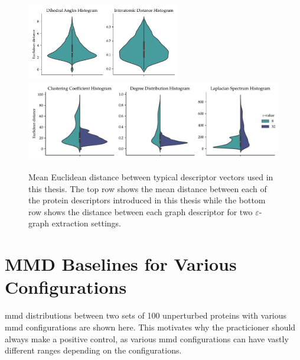\begin{figure}
  \centering
  \includegraphics[width=0.6\textwidth]{./figures/results/violin_protein_descriptors.pdf}
  \includegraphics[width=\textwidth]{./figures/results/violin_graph_descriptors.pdf}
  \caption[Mean Euclidean distance between typical descriptor vectors used in
  this thesis]{Mean Euclidean distance between typical descriptor vectors used in
this thesis. The top row shows the mean distance between each of the protein
descriptors introduced in this thesis while the bottom row shows the distance
between each graph descriptor for two $\varepsilon$-graph extraction settings.}
  \label{fig:mean_distance_embedding}
\end{figure} %

\clearpage
\section{MMD Baselines for Various Configurations}\label{sec:mmd_baselines}
\acrshort{mmd} distributions between two sets of 100 unperturbed proteins with
various \acrshort{mmd} configurations are shown here. This motivates why the
practicioner should always make a positive control, as various \acrshort{mmd}
configurations can have vastly different ranges depending on the configurations.

